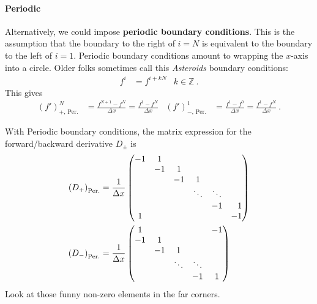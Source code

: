 \paragraph{Periodic} Alternatively, we could  impose \textbf{periodic boundary conditions}. This is the assumption that the boundary to the right of $i=N$ is equivalent to the boundary to the left of $i=1$. Periodic boundary conditions amount to wrapping the $x$-axis into a circle. Older folks sometimes call this \emph{Asteroids} boundary conditions:
\begin{align}
  f^{i} &= f^{i+ kN}
  & k\in \mathbb{Z} \ .
\end{align}
This gives
\begin{align}
  (f')^N_\text{$+$, Per.} &= \frac{f^{N+1} - f^N}{\Delta x}
  = 
  \frac{f^1- f^N}{\Delta x}  
  &
 (f')^1_\text{$-$, Per.} &=\frac{f^{1} - f^0}{\Delta x} 
 = \frac{f^{1} - f^N}{\Delta x} 
  \ .
\end{align}
\begin{example}
With Periodic boundary conditions, the matrix expression for the forward/backward derivative $D_\pm$ is
\begin{align}
    \left(D_+\right)_\text{Per.}
    &=
    \frac{1}{\Delta x}
    \begin{pmatrix}
        -1 & 1 & & &  \\
        & -1 & 1 & &  \\
        & & -1 & 1 &  \\
        & & & \ddots & \ddots &  \\
        & & & & -1 & \pp 1 \\
        1 & & & & & -1 
    \end{pmatrix}
    \\
    \left(D_-\right)_\text{Per.}
    &=
    \frac{1}{\Delta x}
    \begin{pmatrix}
        1 & & & &  -1\\
         -1 & 1 & &  \\
        & -1 & 1 &  \\
         & & \ddots & \ddots &  \\
        & & & -1 &  1 
    \end{pmatrix}
\end{align}
Look at those funny non-zero elements in the far corners. 
\end{example}
